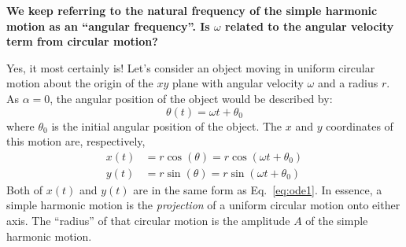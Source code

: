 \begin{remark}
  \textbf{We keep referring to the natural frequency of the simple harmonic
    motion as an ``angular frequency''. Is $\omega$ related to the angular
    velocity term from circular motion?}

  Yes, it most certainly is! Let's consider an object moving in uniform circular
  motion about the origin of the $xy$ plane with angular velocity $\omega$
  and a radius $r$. As $\alpha=0$, the angular position of the object would be
  described by:
  \begin{equation*}
    \theta(t)=\omega t+\theta_0
  \end{equation*}
  where $\theta_0$ is the initial angular position of the object. The $x$ and
  $y$ coordinates of this motion are, respectively,
  \begin{align*}
    x(t) &=r\cos(\theta)=r\cos(\omega t+\theta_0)\\
    y(t) &=r\sin(\theta)=r\sin(\omega t+\theta_0)
  \end{align*}
  Both of $x(t)$ and $y(t)$ are in the same form as Eq.~\ref{eq:ode1}. In
  essence, a simple harmonic motion is the \emph{projection} of a uniform
  circular motion onto either axis. The ``radius'' of that circular motion is
  the amplitude $A$ of the simple harmonic motion. 
  \begin{center}
  \end{center}   
\end{remark}


